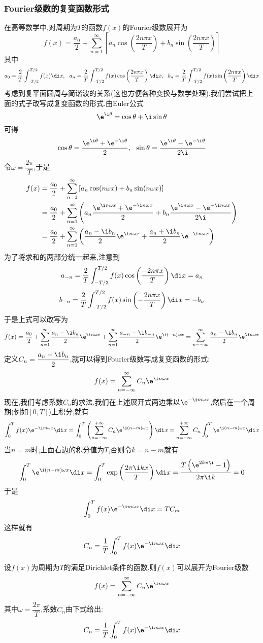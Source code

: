 \documentclass{ctexart}
\begin{document}
\subsubsection{Fourier级数的复变函数形式}
在高等数学中,对周期为$T$的函数$f(x)$的Fourier级数展开为
\[f(x)=\dfrac{a_0}{2}+\sum_{n=1}^{\infty}\left[a_n\cos\left(\dfrac{2n\pi x}{T}\right)+b_n\sin\left(\dfrac{2n\pi x}{T}\right)\right]\]
其中
\[a_0=\dfrac{2}{T}\int_{-T/2}^{T/2}f(x)\di x,\ \ a_n=\dfrac{2}{T}\int_{-T/2}^{T/2}f(x)\cos\left(\dfrac{2n\pi x}{T}\right)\di x,\ \ b_n=\dfrac{2}{T}\int_{-T/2}^{T/2}f(x)\sin\left(\dfrac{2n\pi x}{T}\right)\di x\]
\indent 考虑到复平面圆周与简谐波的关系(这也方便各种变换与数学处理),我们尝试把上面的式子改写成复变函数的形式.由Euler公式
\[\e^{\i\theta}=\cos\theta+\i\sin\theta\]
可得
\[\cos\theta=\dfrac{\e^{\i\theta}+\e^{-\i\theta}}{2},\ \ \sin\theta=\dfrac{\e^{\i\theta}-\e^{-\i\theta}}{2\i}\]
令$\omega=\dfrac{2\pi}{T}$,于是
\[\begin{aligned}
    f(x)
    &= \dfrac{a_0}{2}+\sum_{n=1}^{\infty}\left[a_n\cos(n\omega x)+b_n\sin(n\omega x)\right]\\
    &= \dfrac{a_0}{2}+\sum_{n=1}^{\infty}\left(a_n\dfrac{\e^{\i n\omega x}+\e^{-\i n\omega x}}{2}+b_n\dfrac{\e^{\i n\omega x}-\e^{-\i n\omega x}}{2\i}\right)\\
    &= \dfrac{a_0}{2}+\sum_{n=1}^{\infty}\left(\dfrac{a_n-\i b_n}{2}\e^{\i n\omega x}+\dfrac{a_n+\i b_n}{2}\e^{-\i n\omega x}\right)
\end{aligned}\]
为了将求和的两部分统一起来,注意到
\[a_{-n}=\dfrac{2}{T}\int_{-T/2}^{T/2}f(x)\cos\left(\dfrac{-2n\pi x}{T}\right)\di x=a_n\]
\[b_{-n}=\dfrac{2}{T}\int_{-T/2}^{T/2}f(x)\sin\left(-\dfrac{2n\pi x}{T}\right)\di x=-b_n\]
于是上式可以改写为
\[f(x)
=\dfrac{a_0}{2}+\sum_{n=1}^{\infty}\dfrac{a_n-\i b_n}{2}\e^{\i n\omega x}+\sum_{n=1}^{\infty}\dfrac{a_{-n}-\i b_{-n}}{2}\e^{\i(-n)\omega x}
=\sum_{n=-\infty}^{\infty}\dfrac{a_n-\i b_n}{2}\e^{\i n\omega x}\]
定义$C_n=\dfrac{a_n-\i b_n}{2}$,就可以得到Fourier级数写成复变函数的形式:
\[f(x)=\sum_{n=-\infty}^{\infty}C_n\e^{\i n\omega x}\]
现在,我们考虑系数$C_n$的求法.我们在上述展开式两边乘以$\e^{-\i m\omega x}$,然后在一个周期(例如$[0,T]$)上积分,就有
\[\int_{0}^{T}f(x)\e^{-\i m\omega x}\di x
=\int_{0}^{T}\left(\sum_{n=-\infty}^{+\infty}C_n\e^{\i(n-m)\omega x}\right)\di x
=\sum_{n=-\infty}^{+\infty}C_n\int_{0}^{T}\e^{\i(n-m)\omega x}\di x\]
当$n=m$时,上面右边的积分值为$T$,否则令$k=n-m$就有
\[\int_0^{T}\e^{\i(n-m)\omega x}\di x=\int_0^{T}\exp\left(\dfrac{2\pi\i kx}{T}\right)\di x=\dfrac{T\left(\e^{2k\pi\i}-1\right)}{2\pi\i k}=0\]
于是
\[\int_{0}^{T}f(x)\e^{-\i m\omega x}\di x=TC_m\]
这样就有
\[C_n=\dfrac{1}{T}\int_{0}^{T}f(x)\e^{-\i n\omega x}\di x\]
\begin{theorem}[Fourier级数展开的复变函数形式]
    设$f(x)$为周期为$T$的满足Dirichlet条件的函数,则$f(x)$可以展开为Fourier级数
    \[f(x)=\sum_{n=-\infty}^{\infty}C_n\e^{\i n\omega x}\]
    其中$\omega=\dfrac{2\pi}{T}$,系数$C_n$由下式给出:
    \[C_n=\dfrac{1}{T}\int_{0}^{T}f(x)\e^{-\i n\omega x}\di x\]
\end{theorem}
\end{document}
